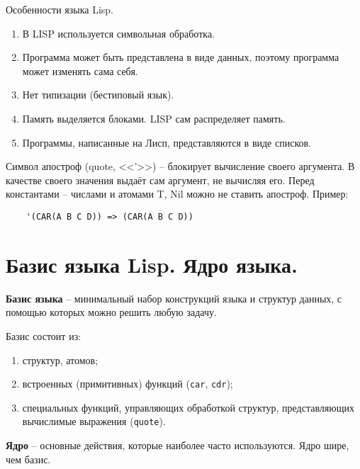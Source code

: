 Особенности языка Lisp.

\begin{enumerate}
	\item В LISP используется символьная обработка.
	\item Программа может быть представлена в виде данных, поэтому программа может изменять сама себя.
	\item Нет типизации (бестиповый язык).
	\item Память выделяется блоками. LISP сам распределяет память.
	\item Программы, написанные на Лисп, представляются в виде списков.
\end{enumerate}


Символ апостроф (quote, <<'>>) -- блокирует вычисление своего аргумента. В качестве своего значения выдаёт сам аргумент, не вычисляя его. Перед константами – числами и  атомами T, Nil можно не ставить апостроф. Пример:

\begin{lstlisting}
	'(CAR(A B C D)) => (CAR(A B C D))
\end{lstlisting}

\section{Базис языка Lisp. Ядро языка.}

\textbf{Базис языка} -- минимальный набор конструкций языка и структур данных, с помощью которых можно решить любую задачу.

Базис состоит из:
\begin{enumerate}
    \item структур, атомов;
    \item встроенных (примитивных) функций (\texttt{car}, \texttt{cdr});
    \item специальных функций, управляющих обработкой структур, представляющих вычислимые выражения (\texttt{quote}).
\end{enumerate}

\textbf{Ядро} -- основные действия, которые наиболее часто используются. Ядро шире, чем базис.
